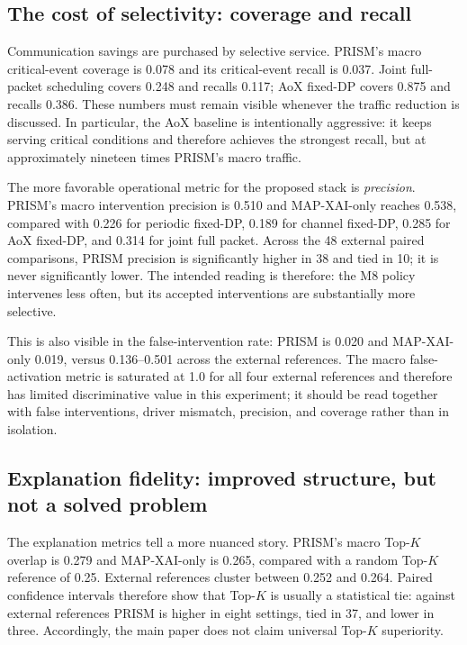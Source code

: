 \documentclass[11pt]{article}
\newcommand{\MAP}{MAP-XAI}
\begin{document}
\subsection{The cost of selectivity: coverage and recall}
Communication savings are purchased by selective service. PRISM's macro critical-event coverage is 0.078 and its critical-event recall is 0.037. Joint full-packet scheduling covers 0.248 and recalls 0.117; AoX fixed-DP covers 0.875 and recalls 0.386. These numbers must remain visible whenever the traffic reduction is discussed. In particular, the AoX baseline is intentionally aggressive: it keeps serving critical conditions and therefore achieves the strongest recall, but at approximately nineteen times PRISM's macro traffic.

The more favorable operational metric for the proposed stack is \emph{precision}. PRISM's macro intervention precision is 0.510 and \MAP{}-only reaches 0.538, compared with 0.226 for periodic fixed-DP, 0.189 for channel fixed-DP, 0.285 for AoX fixed-DP, and 0.314 for joint full packet. Across the 48 external paired comparisons, PRISM precision is significantly higher in 38 and tied in 10; it is never significantly lower. The intended reading is therefore: the M8 policy intervenes less often, but its accepted interventions are substantially more selective.

This is also visible in the false-intervention rate: PRISM is 0.020 and \MAP{}-only 0.019, versus 0.136--0.501 across the external references. The macro false-activation metric is saturated at 1.0 for all four external references and therefore has limited discriminative value in this experiment; it should be read together with false interventions, driver mismatch, precision, and coverage rather than in isolation.




\subsection{Explanation fidelity: improved structure, but not a solved problem}
The explanation metrics tell a more nuanced story. PRISM's macro Top-$K$ overlap is 0.279 and \MAP{}-only is 0.265, compared with a random Top-$K$ reference of 0.25. External references cluster between 0.252 and 0.264. Paired confidence intervals therefore show that Top-$K$ is usually a statistical tie: against external references PRISM is higher in eight settings, tied in 37, and lower in three. Accordingly, the main paper does not claim universal Top-$K$ superiority.
\end{document}
